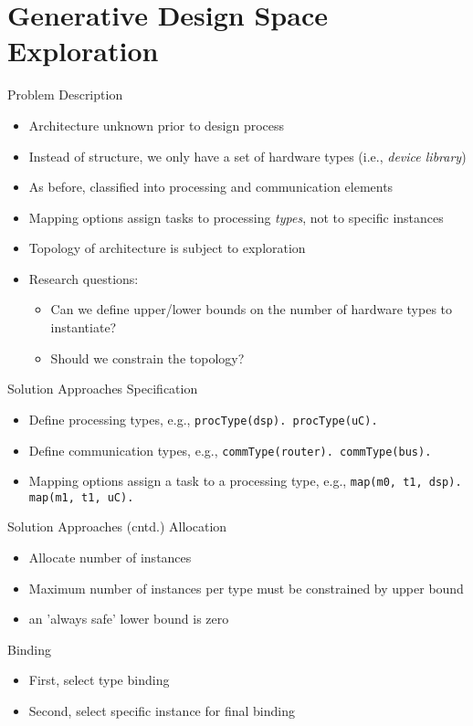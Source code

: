 \documentclass[11pt]{beamer}
\begin{document}
\section{Generative Design Space Exploration}

\begin{frame}{Problem Description}
  \begin{itemize}
    \item Architecture unknown prior to design process
    \item Instead of structure, we only have a set of hardware types (i.e., \textit{device library})
    \item As before, classified into processing and communication elements
    \item Mapping options assign tasks to processing \textit{types}, not to specific instances
    \item Topology of architecture is subject to exploration 
    \item Research questions:
    \begin{itemize}
      \item Can we define upper/lower bounds on the number of hardware types to instantiate?
      \item Should we constrain the topology? 
    \end{itemize}
  \end{itemize}
\end{frame}

\begin{frame}{Solution Approaches }
  Specification
  \begin{itemize} 
     \item Define processing types, e.g., \texttt{procType(dsp). procType(uC).}
     \item Define communication types, e.g., \texttt{commType(router). commType(bus).}
     \item Mapping options assign a task to a processing type, e.g., \texttt{map(m0, t1, dsp). map(m1, t1, uC).}
  \end{itemize}
\end{frame}

\begin{frame}{Solution Approaches (cntd.)}
    Allocation
  \begin{itemize} 
     \item Allocate number of instances
     \item Maximum number of instances per type must be constrained by upper bound
     \item an 'always safe' lower bound is zero
  \end{itemize}

  Binding
  \begin{itemize} 
     \item First, select type binding 
     \item Second, select specific instance for final binding
  \end{itemize}
\end{frame}
\end{document}
